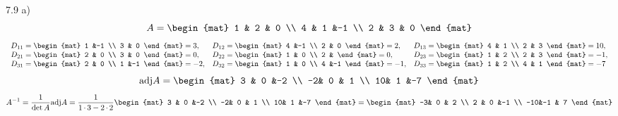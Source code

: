 \begin{task}{7.9 a)}
	\[A=\begin{mat}
		1 & 2 & 0 \\
		4 & 1 &-1 \\
		2 & 3 & 0
	\end{mat}\]
	\[\begin{array}{lll}
		D_{11}=\begin{mat}
			1 &-1 \\
			3 & 0
		\end{mat}=3, 
		&D_{12}=\begin{mat}
			4 &-1 \\
			2 & 0
		\end{mat}=2,
		&D_{13}=\begin{mat}
			4 & 1 \\
			2 & 3
		\end{mat}=10, \\
		D_{21}=\begin{mat}
			2 & 0 \\
			3 & 0
		\end{mat}=0, 
		&D_{22}=\begin{mat}
			1 & 0 \\
			2 & 
		\end{mat}=0,
		&D_{23}=\begin{mat}
			1 & 2 \\
			2 & 3
		\end{mat}=-1, \\
		D_{31}=\begin{mat}
			2 & 0 \\
			1 &-1
		\end{mat}=-2, 
		&D_{32}=\begin{mat}
			1 & 0 \\
			4 &-1
		\end{mat}=-1,
		&D_{33}=\begin{mat}
			1 & 2 \\
			4 & 1
		\end{mat}=-7
	\end{array}\]
	\[\adj A =\begin{mat}
		3 & 0 &-2 \\
		-2& 0 & 1 \\
		10& 1 &-7
	\end{mat}\]
	\[A^{-1}=\frac{1}{\det A}\adj A= 
	\frac{1}{1\*3-2\*2}
	\begin{mat}
		3 & 0 &-2 \\
		-2& 0 & 1 \\
		10& 1 &-7
	\end{mat}=
	\begin{mat}
		-3& 0 & 2 \\
		2 & 0 &-1 \\
		-10&-1 & 7
	\end{mat}\]
\end{task}

